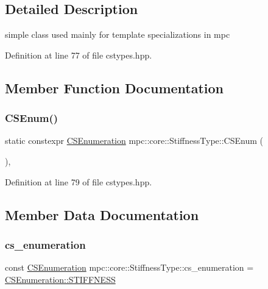 \subsection{Detailed Description}
simple class used mainly for template specializations in mpc 

Definition at line 77 of file cstypes.\+hpp.



\subsection{Member Function Documentation}
\mbox{\label{structmpc_1_1core_1_1_stiffness_type_a29224ca8f2111b45e79b0b2179104347}} 
\subsubsection{\texorpdfstring{C\+S\+Enum()}{CSEnum()}}
{\footnotesize\ttfamily static constexpr \mbox{\hyperlink{namespacempc_1_1core_ad3e8e7d43bfc9202d954d999f7d5c991}{C\+S\+Enumeration}} mpc\+::core\+::\+Stiffness\+Type\+::\+C\+S\+Enum (\begin{DoxyParamCaption}{ }\end{DoxyParamCaption})\hspace{0.3cm}{\ttfamily [inline]}, {\ttfamily [static]}}



Definition at line 79 of file cstypes.\+hpp.



\subsection{Member Data Documentation}
\mbox{\label{structmpc_1_1core_1_1_stiffness_type_aaa2009a4b1aaebb597f2ac96a7d587bf}} 
\subsubsection{\texorpdfstring{cs\+\_\+enumeration}{cs\_enumeration}}
{\footnotesize\ttfamily const \mbox{\hyperlink{namespacempc_1_1core_ad3e8e7d43bfc9202d954d999f7d5c991}{C\+S\+Enumeration}} mpc\+::core\+::\+Stiffness\+Type\+::cs\+\_\+enumeration = \mbox{\hyperlink{namespacempc_1_1core_ad3e8e7d43bfc9202d954d999f7d5c991aa231c1d74fe18f9e82224588887d1971}{C\+S\+Enumeration\+::\+S\+T\+I\+F\+F\+N\+E\+SS}}}



